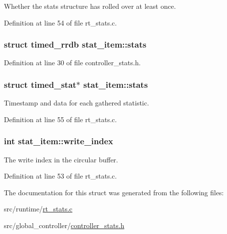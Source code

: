 Whether the stats structure has rolled over at least once. 



Definition at line 54 of file rt\-\_\-stats.\-c.

\hypertarget{structstat__item_ac4feb1e4a0ac9c58669b532bd0c29c45}{
\subsubsection[{stats}]{\setlength{\rightskip}{0pt plus 5cm}struct {\bf timed\-\_\-rrdb} stat\-\_\-item\-::stats}}\label{structstat__item_ac4feb1e4a0ac9c58669b532bd0c29c45}


Definition at line 30 of file controller\-\_\-stats.\-h.

\hypertarget{structstat__item_ad9e139d7db4acd1f95968520023895f5}{
\subsubsection[{stats}]{\setlength{\rightskip}{0pt plus 5cm}struct {\bf timed\-\_\-stat}$\ast$ stat\-\_\-item\-::stats}}\label{structstat__item_ad9e139d7db4acd1f95968520023895f5}


Timestamp and data for each gathered statistic. 



Definition at line 55 of file rt\-\_\-stats.\-c.

\hypertarget{structstat__item_ab965c534375a75af564610e9afe766f4}{
\subsubsection[{write\-\_\-index}]{\setlength{\rightskip}{0pt plus 5cm}int stat\-\_\-item\-::write\-\_\-index}}\label{structstat__item_ab965c534375a75af564610e9afe766f4}


The write index in the circular buffer. 



Definition at line 53 of file rt\-\_\-stats.\-c.



The documentation for this struct was generated from the following files\-:\begin{DoxyCompactItemize}
\item 
src/runtime/\hyperlink{rt__stats_8c}{rt\-\_\-stats.\-c}\item 
src/global\-\_\-controller/\hyperlink{controller__stats_8h}{controller\-\_\-stats.\-h}\end{DoxyCompactItemize}
